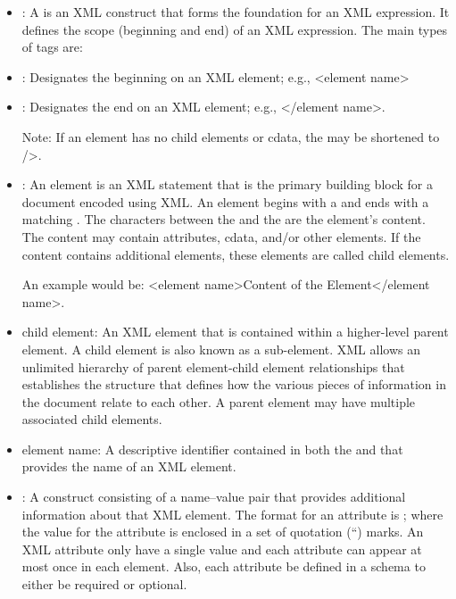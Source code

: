 \begin{itemize}
\item {}:  A  is an XML construct that forms the foundation for an XML expression.  It defines the scope (beginning and end) of an XML expression.  The main types of tags are: 

\item {}:  Designates the beginning on an XML element; e.g., <\gls{element name}> 

\item {}:  Designates the end on an XML element; e.g., </\gls{element name}>. 

\begin{note}
Note: If an element has no \glspl{child element} or \gls{cdata}, the  may be shortened to />.
\end{note}

\item {}:  An element is an XML statement that is the primary building block for a document encoded using XML.  An element begins with a  and ends with a matching .  The characters between the  and the  are the element's content.  The content may contain attributes, \gls{cdata}, and/or other elements.  If the content contains additional elements, these elements are called \glspl{child element}.

An example would be:  <\gls{element name}>Content of the Element</\gls{element name}>.

\item \gls{child element}:  An XML element that is contained within a higher-level \gls{parent element}.  A \gls{child element} is also known as a sub-element.  XML allows an unlimited hierarchy of \gls{parent element}-\gls{child element} relationships that establishes the structure that defines how the various pieces of information in the document relate to each other.  A \gls{parent element} may have multiple associated \glspl{child element}.

\item \gls{element name}:  A descriptive identifier contained in both the  and  that provides the name of an XML element.

\item {}:  A construct consisting of a name–value pair that provides additional information about that XML element.  The format for an attribute is ; where the value for the attribute is enclosed in a set of quotation (“) marks.  An XML attribute \MUST only have a single value and each attribute can appear at most once in each element.  Also, each attribute \MUST be defined in a \gls{schema} to either be required or optional.   


\end{itemize}
